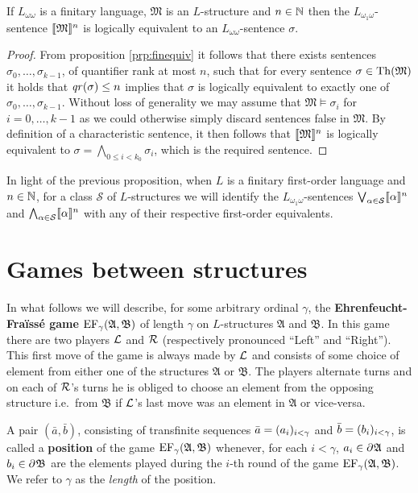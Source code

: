 \begin{prp}
	If $L_{\omega\omega}$ is a finitary language, $\mathfrak{M}$ is an $L$-structure and $n\in\mathbb{N}$ then the $L_{\omega_1\omega}$-sentence $\llbracket\mathfrak{M}\rrbracket^{n}$ is logically equivalent to an $L_{\omega\omega}$-sentence $\sigma$.
\end{prp}
\begin{proof}
	From proposition \ref{prp:finequiv} it follows that there exists sentences $\sigma_0,\dotsc,\sigma_{k-1}$, of quantifier rank at most $n$, such that for every sentence $\sigma\in\operatorname{Th}(\mathfrak{M})$ it holds that $\mathit{qr}(\sigma)\leq n$ implies that $\sigma$ is logically equivalent to exactly one of $\sigma_0,\dotsc,\sigma_{k-1}$.  Without loss of generality we may assume that $\mathfrak{M}\models\sigma_i$ for $i=0,\dotsc,k-1$ as we could otherwise simply discard sentences false in $\mathfrak{M}$. By definition of a characteristic sentence, it then follows that $\llbracket\mathfrak{M}\rrbracket^{n}$ is logically equivalent to $\sigma=\bigwedge_{0\leq i<k_0}\sigma_i$, which is the required sentence.
\end{proof}

In light of the previous proposition, when $L$ is a finitary first-order language and $n\in\mathbb{N}$, for a class $\mathcal{S}$ of $L$-structures we will identify the $L_{\omega_1\omega}$-sentences $\bigvee_{\alpha\in\mathcal{S}}\llbracket\alpha\rrbracket^{n}$ and $\bigwedge_{\alpha\in\mathcal{S}}\llbracket\alpha\rrbracket^{n}$ with any of their respective first-order equivalents.


\section{Games between structures}

In what follows we will describe, for some arbitrary ordinal $\gamma$, the \textbf{Ehrenfeucht-Fra\"iss\'e game} $\operatorname{EF}_\gamma(\mathfrak{A},\mathfrak{B})$ of length $\gamma$ on $L$-structures $\mathfrak{A}$ and $\mathfrak{B}$.  In this game there are two players $\mathcal{L}$ and $\mathcal{R}$ (respectively pronounced ``Left'' and ``Right'').  This first move of the game is always made by $\mathcal{L}$ and consists of some choice of element from either one of the structures $\mathfrak{A}$ or $\mathfrak{B}$.  The players alternate turns and on each of  $\mathcal{R}$'s turns he is obliged to choose an element from the opposing structure i.e.\ from $\mathfrak{B}$ if $\mathcal{L}$'s last move was an element in $\mathfrak{A}$ or vice-versa.

\begin{dfn}[Position]
	A pair $(\bar{a},\bar{b})$, consisting of transfinite sequences $\bar{a}=(a_i)_{i<\gamma}$ and $\bar{b}=(b_i)_{i<\gamma}$, is called a \textbf{position} of the game $\operatorname{EF}_\gamma(\mathfrak{A},\mathfrak{B})$ whenever, for each $i<\gamma$, $a_i\in\partial^{}\mathfrak{A}$ and $b_i\in\partial^{}\mathfrak{B}$ are the elements played during the $i$-th round of the game $\operatorname{EF}_\gamma(\mathfrak{A},\mathfrak{B})$.  We refer to $\gamma$ as the \textit{length} of the position.
\end{dfn}

